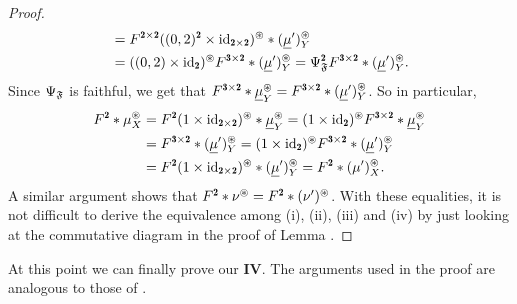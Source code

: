 \begin{proof}
\begin{align*}
&=F^{\due\times\due}((0,2)^\due\times\id_{\due\times\due})^\circledast*(\underline \mu')^\circledast_Y\\
&=((0,2)\times\id_\due)^\circledast F^{\tre\times\due}*(\underline \mu')^\circledast_Y=\Psi^\due_\F F^{\tre\times\due}*(\underline \mu')^\circledast_Y.
\end{align*}
Since $\Psi_{\mathfrak{F}}$ is faithful, we get that $F^{\tre\times\due}*\underline \mu^\circledast_Y=F^{\tre\times\due}*(\underline \mu')^\circledast_Y$. So in particular,
\begin{align*}
F^\due*\mu^\circledast_X&=F^{\due}(1\times \id_{\due\times\due})^\circledast *\underline \mu^\circledast_Y=(1\times \id_\due)^\circledast F^{\tre\times\due}*\underline \mu^\circledast_Y\\
&=F^{\tre\times\due}*(\underline \mu')^\circledast_Y=(1\times \id_\due)^\circledast F^{\tre\times\due}*(\underline \mu')^\circledast_Y\\
&=F^{\due}(1\times \id_{\due\times\due})^\circledast *(\underline \mu')^\circledast_Y=F^\due*(\mu')^\circledast_X.
\end{align*}
A similar argument shows that $F^\due*\nu^\circledast =F^\due*(\nu')^\circledast$. With these equalities, it is not difficult to derive the equivalence among (i), (ii), (iii) and (iv) by just looking at the commutative diagram in the proof of Lemma .
\end{proof}


At this point we can finally prove our \athm\textbf{IV}. The arguments used in the proof are analogous to those of  \cite[\athm\textbf{2.10} and \athm\textbf{2.11}]{RW}.

